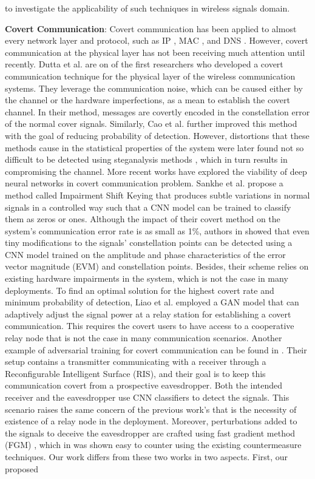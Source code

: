 to investigate the applicability of such techniques in wireless signals domain.


\textbf{Covert Communication}: Covert communication has been applied to almost every network layer and protocol, such as IP \cite{cabuk2004ip}, MAC \cite{sheikholeslami2020covert}, and DNS \cite{nussbaum2009robust}. However, covert communication at the physical layer has not been receiving much attention until recently. Dutta et al. \cite{dutta2012secret} are on of the first researchers who developed a covert communication technique for the physical layer of the wireless communication systems. They leverage the communication noise, which can be caused either by the channel or the hardware imperfections, as a mean to establish the covert channel. In their method, messages are covertly encoded in the constellation error of the normal cover signals. Similarly, Cao et al. \cite{cao2018wireless} further improved this method with the goal of reducing probability of detection. However, distortions that these methods cause in the statistical properties of the system were later found not so difficult to be detected using steganalysis methods \cite{huang2020exploiting}, which in turn results in compromising the channel. More recent works have explored the viability of deep neural networks in covert communication problem. Sankhe et al. \cite{sankhe2019impairment} propose a method called Impairment Shift Keying that produces subtle variations in normal signals in a controlled way such that a CNN model can be trained to classify them as zeros or ones. Although the impact of their covert method on the system's communication error rate is as small as 1\%,  authors in \cite{huang2021detection} showed that even tiny modifications to the signals' constellation points can be detected using a CNN model trained on the amplitude and phase characteristics of the error vector magnitude (EVM) and constellation points. Besides, their scheme relies on existing hardware impairments in the system, which is not the case in many deployments. To find an optimal solution for the highest covert rate and minimum probability of detection, Liao et al. \cite{liao2020generative} employed a GAN model that can adaptively adjust the signal power at a relay station for establishing a covert communication. This requires the covert users to have access to a cooperative relay node that is not the case in many communication scenarios. Another example of adversarial training for covert communication can be found in \cite{kim2022covert}. Their setup contains a transmitter communicating with a receiver through a Reconfigurable Intelligent Surface (RIS), and their goal is to keep this communication covert from a prospective eavesdropper. Both the intended receiver and the eavesdropper use CNN classifiers to detect the signals. This scenario raises the same concern of the previous work's that is the necessity of existence of a relay node in the deployment. Moreover, perturbations added to the signals to deceive the eavesdropper are crafted using fast gradient method (FGM) \cite{goodfellow2014explaining}, which in \cite{bahramali2021robust} was shown easy to counter using the existing countermeasure techniques. Our work differs from these two works in two aspects. First, our proposed 
